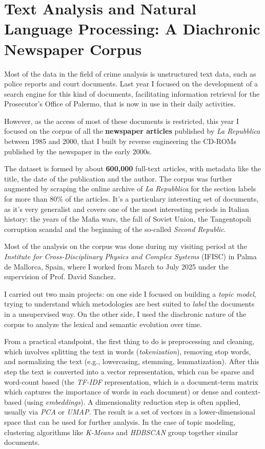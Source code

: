 \section{Text Analysis and Natural Language Processing: A Diachronic Newspaper Corpus}

Most of the data in the field of crime analysis is unstructured text data, such as police reports and court documents. Last year I focused on the development of a search engine for this kind of documents, facilitating information retrieval for the Prosecutor's Office of Palermo, that is now in use in their daily activities.

However, as the access of most of these documents is restricted, this year I focused on the corpus of all the \textbf{newspaper articles} published by \textit{La Repubblica} between 1985 and 2000, that I built by reverse engineering the CD-ROMs published by the newspaper in the early 2000s.

The dataset is formed by about \textbf{600,000} full-text articles, with metadata like the title, the date of the publication and the author. The corpus was further augmented by scraping the online archive of \textit{La Repubblica} for the section labels for more than 80\% of the articles. It's a particulary interesting set of documents, as it's very generalist and covers one of the most interesting periods in Italian history: the years of the Mafia wars, the fall of Soviet Union, the Tangentopoli corruption scandal and the beginning of the so-called \textit{Second Republic}.

Most of the analysis on the corpus was done during my visiting period at the \textit{Institute for Cross-Disciplinary Physics and Complex Systems} (IFISC) in Palma de Mallorca, Spain, where I worked from March to July 2025 under the supervision of Prof. David Sanchez.

I carried out two main projects: on one side I focused on building a \textit{topic model}, trying to understand which metodologies are best suited to \textit{label} the documents in a unsupervised way. On the other side, I used the diachronic nature of the corpus to analyze the lexical and semantic evolution over time.

From a practical standpoint, the first thing to do is preprocessing and cleaning, which involves splitting the text in words (\textit{tokenization}), removing stop words, and normalizing the text (e.g., lowercasing, stemming, lemmatization). After this step the text is converted into a vector representation, which can be sparse and word-count based (the \textit{TF-IDF} representation, which is a document-term matrix which captures the importance of words in each document) or dense and context-based (using \textit{embeddings}). A dimensionality reduction step is often applied, usually via \textit{PCA} or \textit{UMAP}. The result is a set of vectors in a lower-dimensional space that can be used for further analysis. In the case of topic modeling, clustering algorithms like \textit{K-Means} and \textit{HDBSCAN} group together similar documents.

